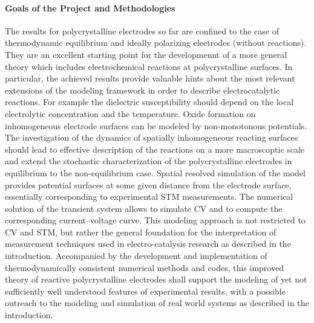 \documentclass[a4paper,10pt]{article}
\begin{document}
\paragraph{Goals of the Project and Methodologies}

The results for polycrystalline electrodes  so far are confined to the
case of  thermodynamic equilibrium  and ideally  polarizing electrodes
(without  reactions). They  are an  excellent starting  point for  the
developmennt of  a more general theory  which includes electrochemical
reactions at polycrystalline surfaces. 
In particular, the achieved results provide valuable hints about the most relevant extensions of the modeling framework in order to describe electrocatalytic reactions.
For example the dielectric susceptibility should depend on the local electrolytic concentration
and the temperature. 
Oxide formation on inhomogeneous electrode surfaces can be modeled
by non-monotonous potentials.
The investigation of the dynamics of spatially inhomogeneous reacting surfaces
should lead to effective description of the reactions on a more macroscoptic scale
and extend the stochastic characterization of the polycrystalline electrodes in equilibrium
to the non-equilibrium case.
%
Spatial resolved simulation of the model provides potential surfaces at
some given distance from the electrode surface, essentially corresponding to experimental STM measurements. 
The numerical solution of the transient system allows to simulate CV and to compute the corresponding current--voltage curve. 
This modeling approach is not restricted to CV and STM, but rather the general foundation for the interpretation of 
measurement techniques used in electro-catalysis research as described in the introduction.
%
Accompanied by the development
and implementation  of thermodynamically consistent  numerical methods
and codes, this improved theory of reactive polycrystalline electrodes
shall support  the modeling  of yet  not sufficiently  well understood
features  of experimental  results, with  a possible  outreach to  the
modeling  and simulation  of real  world systems  as described  in the
introduction.

\end{document}
